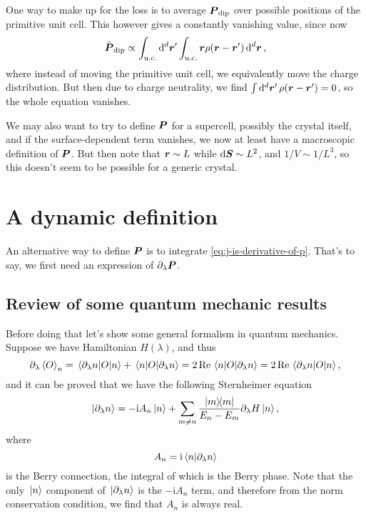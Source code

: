 \documentclass[hyperref, a4paper]{article}
\newcommand*{\ii}{\mathrm{i}}
\begin{document}
One way to make up for the loss is to average $\vb*{P}_{\text{dip}}$ 
over possible positions of the primitive unit cell.
This however gives a constantly vanishing value, 
since now 
\[
    \bar{\vb*{P}}_{\text{dip}} 
    \propto \int_{\text{u.c.}} \dd[d]{\vb*{r}'} \int_{\text{u.c.}} \vb*{r} \rho(\vb*{r} - \vb*{r}') \dd[d]{\vb*{r}}  ,
\]
where instead of moving the primitive unit cell,
we equivalently move the charge distribution.
But then due to charge neutrality, 
we find $\int \dd[d]{\vb*{r}'} \rho(\vb*{r} - \vb*{r}') = 0$,
so the whole equation vanishes. 

We may also want to try to define $\vb*{P}$ for a supercell, 
possibly the crystal itself,
and if the surface-dependent term vanishes, 
we now at least have a macroscopic definition of $\vb*{P}$.
But then note that $\vb*{r} \sim L$ 
while $\dd{\vb*{S}} \sim L^2$,
and $1 / V \sim 1 / L^3$,
so this doesn't seem to be possible for a generic crystal.

\section{A dynamic definition} 

An alternative way to define $\vb*{P}$
is to integrate \eqref{eq:j-is-derivative-of-p}.
That's to say, we first need an expression of $\partial_\lambda \vb*{P}$.

\subsection{Review of some quantum mechanic results}

Before doing that let's show some general formalism in quantum mechanics. 
Suppose we have Hamiltonian $H(\lambda)$,
and thus 
\begin{equation}
    \partial_\lambda \expval{O}_n = 
    \mel{\partial_\lambda n}{O}{n} 
    + \mel{n}{O}{\partial_\lambda n}
    = 2 \Re \mel{n}{O}{\partial_\lambda n}
    = 2 \Re \mel{\partial_\lambda n}{O}{n},
\end{equation}
and it can be proved that we have the following Sternheimer equation
\begin{equation}
    \ket{\partial_\lambda n} = - \ii A_n \ket*{n} 
    + \sum_{m \neq n} \frac{\dyad{m}}{E_n - E_m} \partial_\lambda H \ket*{n},
    \label{eq:sternheimer}
\end{equation}
where 
\begin{equation}
    A_n = \ii \braket{n}{\partial_\lambda n}
    \label{eq:berry-phase}
\end{equation}
is the Berry connection, 
the integral of which is the Berry phase.
Note that the only $\ket*{n}$ component of $\ket*{\partial_\lambda n}$ 
is the $- \ii A_n$ term, 
and therefore from the norm conservation condition, 
we find that $A_n$ is always real. 
\end{document}
